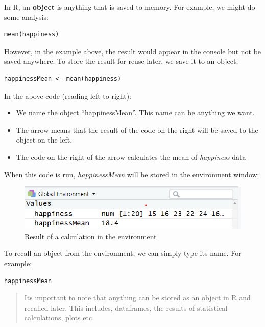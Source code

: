 \documentclass[
]{book}
\providecommand{\tightlist}{%
  \setlength{\itemsep}{0pt}\setlength{\parskip}{0pt}}
\begin{document}
In R, an \textbf{object} is anything that is saved to memory. For example, we might do some analysis:

\begin{verbatim}
mean(happiness)
\end{verbatim}

However, in the example above, the result would appear in the console but not be saved anywhere. To store the result for reuse later, we save it to an object:

\begin{verbatim}
happinessMean <- mean(happiness)
\end{verbatim}

In the above code (reading left to right):

\begin{itemize}
\tightlist
\item
  We name the object ``happinessMean''. This name can be anything we want.
\item
  The arrow means that the result of the code on the right will be saved to the object on the left.
\item
  The code on the right of the arrow calculates the mean of \emph{happiness} data
\end{itemize}

When this code is run, \emph{happinessMean} will be stored in the environment window:

\begin{figure}
\centering
\includegraphics{images/saveobject.png}
\caption{Result of a calculation in the environment}
\end{figure}

To recall an object from the environment, we can simply type its name. For example:

\begin{verbatim}
happinessMean 
\end{verbatim}

\begin{quote}
Its important to note that anything can be stored as an object in R and recalled later. This includes, dataframes, the results of statistical calculations, plots etc.
\end{quote}
\end{document}
